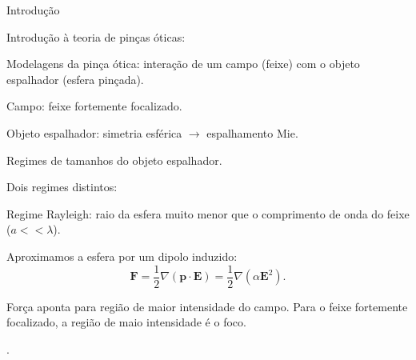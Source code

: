 \documentclass[10pt]{beamer}
\begin{document}

\begin{frame}[fragile]{Introdução}

Introdução à teoria de pinças óticas: \\
    \begin{center}
        Modelagens da pinça ótica: interação de um campo (feixe) com o objeto espalhador (esfera pinçada).

        Campo: feixe fortemente focalizado.

        Objeto espalhador: simetria esférica $\rightarrow$ espalhamento Mie.

        

    \end{center}

\end{frame}

\begin{frame}[fragile]{Regimes de tamanhos do objeto espalhador.}

Dois regimes distintos: \\
    \begin{center}
        Regime Rayleigh: raio da esfera muito menor que o comprimento de onda do feixe ($a<<\lambda$).

        Aproximamos a esfera por um dipolo induzido:
        \begin{equation}
        {\mathbf F} = \frac{1}{2}\nabla({\mathbf p}\cdot{\mathbf E})=\frac{1}{2}\nabla(\alpha{\mathbf E}^2).
        \end{equation}

        Força aponta para região de maior intensidade do campo. Para o feixe fortemente focalizado, a região de maio intensidade é o foco.

    \end{center}
.
\end{frame}
\end{document}
